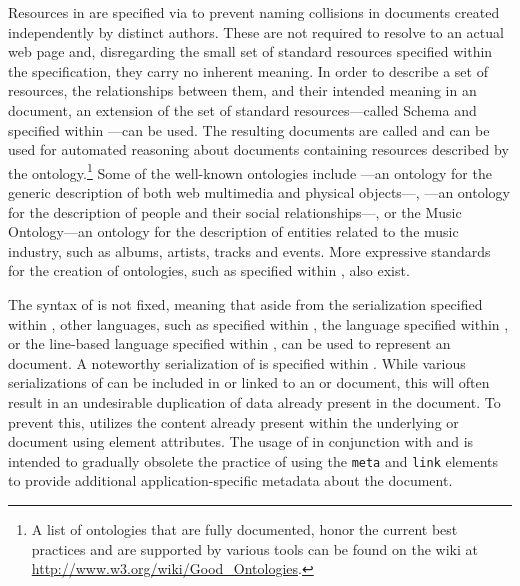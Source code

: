 \documentclass{book}
\begin{document}
Resources in  are specified via  to prevent naming
collisions in  documents created independently by distinct authors.
These  are not required to resolve to an actual web page and,
disregarding the small set of standard resources specified within the
 specification, they carry no inherent meaning.  In order to
describe a set of resources, the relationships between them, and their intended
meaning in an  document, an extension of the set of standard
resources---called  Schema and specified within
\cite{brickley04}---can be used.  The resulting documents are called
  and can be used for automated
reasoning about  documents containing resources described by the
ontology.\footnote{
  A list of ontologies that are fully documented, honor the current best
  practices and are supported by various tools can be found on the
   wiki at \url{http://www.w3.org/wiki/Good_Ontologies}.
} Some of the well-known ontologies include ---an ontology for the
generic description of both web multimedia and physical objects---,
---an ontology for the description of people and their social
relationships---, or the Music Ontology---an ontology for the description of
entities related to the music industry, such as albums, artists, tracks and
events. More expressive standards for the creation of ontologies, such as
 specified within \cite{mcguinness04}, also exist.

The syntax of  is not fixed, meaning that aside from the
 serialization specified within \cite{lassira99}, other
languages, such as  specified within \cite{sporny14}, the
 language specified within \cite{beckett14:turtle}, or the
line-based  language specified within \cite{beckett14:nt}, can be
used to represent an  document. A noteworthy serialization of
 is  specified within \cite{adida08}. While various
serializations of  can be included in or linked to an
 or  document, this will often result in an
undesirable duplication of data already present in the document. To prevent
this,  utilizes the content already present within the underlying
 or  document using element attributes. The
usage of  in conjunction with  and  is
intended to gradually obsolete the practice of using the \texttt{meta} and
\texttt{link} elements to provide additional application-specific metadata about
the document.
\end{document}

